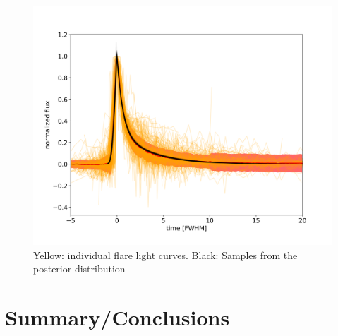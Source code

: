 \documentclass[twocolumn]{aastex62}
\begin{document}
\begin{figure}
	\includegraphics[width=0.5\columnwidth]{11_03_2020_11_15_all_davenport_fit_median_norel.png}
    \caption{Yellow: individual flare light curves. Black: Samples from the posterior distribution}
    \label{fig:template}
\end{figure}


\section{Summary/Conclusions} \label{sec:conclusion}


\acknowledgments

\vspace{5mm}
\facilities{}


 
\end{document}
